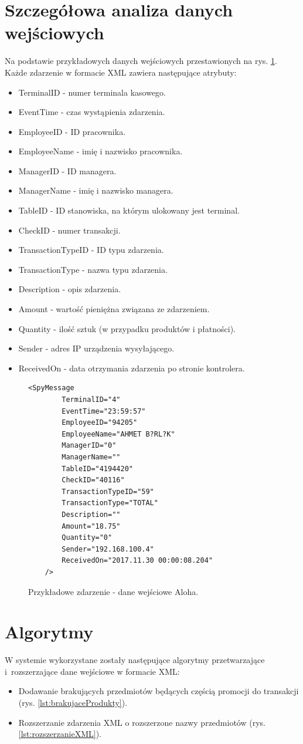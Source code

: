 \documentclass[a4paper]{book}
\begin{document}
\section{Szczegółowa analiza danych wejściowych}
Na podstawie przykładowych danych wejściowych przestawionych na rys. \ref{lst:przykladoweZdarzenieAloha2}. Każde zdarzenie w formacie XML zawiera następujące atrybuty:
\begin{itemize}
	\setlength\itemsep{0.1pt}
	\item TerminalID - numer terminala kasowego.
	\item EventTime - czas wystąpienia zdarzenia.
	\item EmployeeID - ID pracownika.
	\item EmployeeName - imię i nazwisko pracownika.
	\item ManagerID - ID managera.
	\item ManagerName - imię i nazwisko managera.
	\item TableID - ID stanowiska, na którym ulokowany jest terminal.
	\item CheckID - numer transakcji.
	\item TransactionTypeID - ID typu zdarzenia.
	\item TransactionType - nazwa typu zdarzenia.
	\item Description - opis zdarzenia.
	\item Amount - wartość pieniężna związana ze zdarzeniem.
	\item Quantity - ilość sztuk (w przypadku produktów i płatności).
	\item Sender - adres IP urządzenia wysyłającego.
	\item ReceivedOn - data otrzymania zdarzenia po stronie kontrolera.
\end{itemize}
\begin{figure}[t]
	\begin{lstlisting}[frame=single, breaklines=true, numbers=none]
	<SpyMessage 
		TerminalID="4" 
		EventTime="23:59:57" 
		EmployeeID="94205" 
		EmployeeName="AHMET B?RL?K" 
		ManagerID="0" 
		ManagerName="" 
		TableID="4194420" 
		CheckID="40116" 
		TransactionTypeID="59" 
		TransactionType="TOTAL" 
		Description="" 
		Amount="18.75" 
		Quantity="0" 
		Sender="192.168.100.4" 
		ReceivedOn="2017.11.30 00:00:08.204" 
	/>
	\end{lstlisting}
	\caption{Przykładowe zdarzenie - dane wejściowe Aloha.}
	\label{lst:przykladoweZdarzenieAloha2}
\end{figure}
\section{Algorytmy}
W systemie wykorzystane zostały następujące algorytmy przetwarzające i~rozszerzające dane wejściowe w formacie XML:
\begin{itemize}
	\item Dodawanie brakujących przedmiotów będących częścią promocji do transakcji (rys.  \ref{lst:brakujaceProdukty}).
	\item Rozszerzanie zdarzenia XML o rozszerzone nazwy przedmiotów (rys. \ref{lst:rozszerzanieXML}).
\end{itemize}
\end{document}
